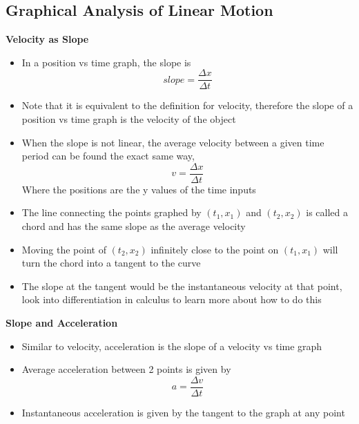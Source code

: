 \subsection{Graphical Analysis of Linear Motion}
\textbf{Velocity as Slope}
\begin{itemize}
    \item In a position vs time graph, the slope is \[slope=\frac{\Delta x}{\Delta t}\]
    \item Note that it is equivalent to the definition for velocity, therefore the slope of a position vs time graph is the velocity of the object
    \item When the slope is not linear, the average velocity between a given time period can be found the exact same way,\[v=\frac{\Delta x}{\Delta t}\] Where the positions are the y values of the time inputs
    \item The line connecting the points graphed by $(t_1,x_1)$ and $(t_2,x_2)$ is called a chord and has the same slope as the average velocity
    \item Moving the point of $(t_2,x_2)$ infinitely close to the point on $(t_1,x_1)$ will turn the chord into a tangent to the curve
    \item The slope at the tangent would be the instantaneous velocity at that point, look into differentiation in calculus to learn more about how to do this
\end{itemize}
\textbf{Slope and Acceleration}
\begin{itemize}
    \item Similar to velocity, acceleration is the slope of a velocity vs time graph
    \item Average acceleration between 2 points is given by \[a=\frac{\Delta v}{\Delta t}\]
    \item Instantaneous acceleration is given by the tangent to the graph at any point
\end{itemize}

\newpage